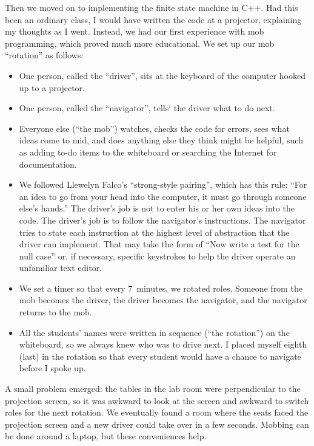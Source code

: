 \documentclass{article}
\begin{document}
Then we moved on to implementing the finite state machine in C++. Had this
been an ordinary class, I would have written the code at a projector,
explaining my thoughts as I went. Instead, we had our first experience with
mob programming, which proved much more educational. We set up our mob
``rotation'' as follows:

\begin{itemize}
\item One person, called the ``driver'', sits at the keyboard of the computer
hooked up to a projector.

\item One person, called the ``navigator'', tells` the driver what to do next.

\item Everyone else (``the mob'') watches, checks the code for errors, sees
what ideas come to mid, and does anything else they think might be helpful,
such as adding to-do items to the whiteboard or searching the Internet for
documentation.

\item We followed Llewelyn Falco's ``strong-style
pairing''\cite{falco2014strong}, which has this rule: ``For an idea to go from
your head into the computer, it must go through someone else's hands.'' The
driver's job is not to enter his or her own ideas into the code. The driver's
job is to follow the navigator's instructions. The navigator tries to state
each instruction at the highest level of abstraction that the driver can
implement. That may take the form of ``Now write a test for the null case''
or, if necessary, specific keystrokes to help the driver operate an unfamiliar
text editor.

\item We set a timer so that every 7 minutes, we rotated roles. Someone from
the mob becomes the driver, the driver becomes the navigator, and the
navigator returns to the mob.

\item All the students' names were written in sequence (``the rotation'')
on the whiteboard, so we always knew who was to drive next. I placed myself
eighth (last) in the rotation so that every student would have a chance to
navigate before I spoke up.
\end{itemize}

A small problem emerged: the tables in the lab room were perpendicular to the
projection screen, so it was awkward to look at the screen and awkward to
switch roles for the next rotation. We eventually found a room where the seats
faced the projection screen and a new driver could take over in a few seconds.
Mobbing can be done around a laptop, but these conveniences help.
\end{document}

